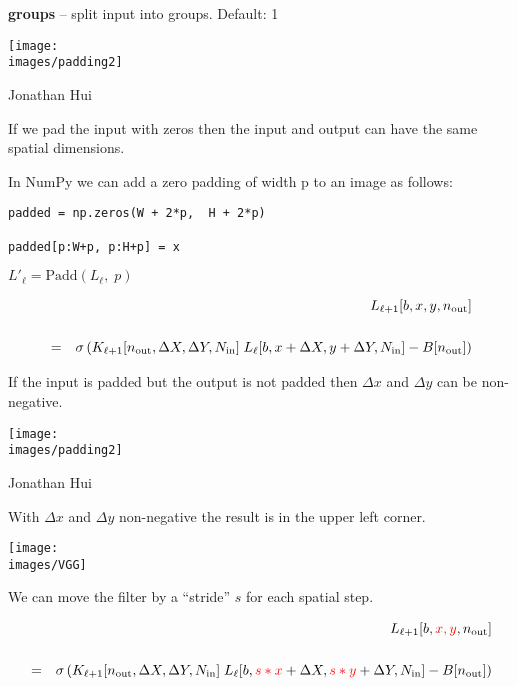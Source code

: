 {\medskip
{\bf groups} – split input into groups. Default: 1


\centerline{\texttt{[image: \\images/padding2]}}
\centerline{\large Jonathan Hui}

\vfill
If we pad the input with zeros then the input and output can have the same spatial dimensions.


In NumPy we can add a zero padding of width p to an image as follows:

\vfill
\begin{verbatim}
padded = np.zeros(W + 2*p,  H + 2*p)

padded[p:W+p, p:H+p] = x
\end{verbatim}


$L'_{{\ell}} = \mathrm{Padd}(L_{{\ell}},\;p)$

\vfill
\begin{eqnarray*}
 & &  L_{{\ell+1}}[b,x,y,n_{\mathrm{out}}] \\
 \\
  & = &   \sigma\left(K_{\ell+1}[n_{\mathrm{out}},\Delta X, \Delta Y,N_{\mathrm{in}}]\; L_{{\ell}}[b,x + \Delta X, y + \Delta Y, N_{\mathrm{in}}] - B[n_{\mathrm{out}}]\right)
\end{eqnarray*}

\vfill
If the input is padded but the output is not padded then $\Delta x$ and $\Delta y$ can be non-negative.


\centerline{\texttt{[image: \\images/padding2]}}
\centerline{\large Jonathan Hui}

\vfill
With $\Delta x$ and $\Delta y$ non-negative the result is in the upper left corner.


\centerline{\texttt{[image: \\images/VGG]}}


We can move the filter by a ``stride'' $s$ for each spatial step.


\vfill
{\huge
\begin{eqnarray*}
 & &  L_{{\ell+1}}[b,{\color{red}x,y},n_{\mathrm{out}}] \\
 \\
  & = &   \sigma\left(K_{\ell+1}[n_{\mathrm{out}},\Delta X, \Delta Y,N_{\mathrm{in}}]\; L_{{\ell}}[b,{\color{red} s*x} + \Delta X, {\color{red} s*y} + \Delta Y, N_{\mathrm{in}}] - B[n_{\mathrm{out}}]\right)
\end{eqnarray*}
}

}
